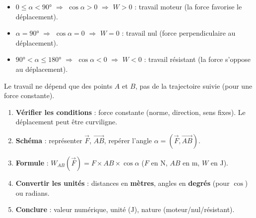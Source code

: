 \documentclass[11pt]{article}
\newcommand{\cle}[1]{{\popxbold\color{popdark}#1}}
\begin{document}
\begin{propriete}
\begin{itemize}
\item $0 \leq \alpha < 90°$ $\Rightarrow$ $\cos\alpha > 0$ $\Rightarrow$ $W > 0$ : travail \cle{moteur} (la force favorise le déplacement).
\item $\alpha = 90°$ $\Rightarrow$ $\cos\alpha = 0$ $\Rightarrow$ $W = 0$ : travail \cle{nul} (force perpendiculaire au déplacement).
\item $90° < \alpha \leq 180°$ $\Rightarrow$ $\cos\alpha < 0$ $\Rightarrow$ $W < 0$ : travail \cle{résistant} (la force s'oppose au déplacement).
\end{itemize}
Le travail ne dépend que des points $A$ et $B$, pas de la trajectoire suivie (pour une force constante).
\end{propriete}

\begin{methode}
\begin{enumerate}
\item \textbf{Vérifier les conditions} : force constante (norme, direction, sens fixes). Le déplacement peut être curviligne.
\item \textbf{Schéma} : représenter $\vec{F}$, $\overrightarrow{AB}$, repérer l'angle $\alpha = (\vec{F}, \overrightarrow{AB})$.
\item \textbf{Formule} : $W_{AB}(\vec{F}) = F \times AB \times \cos\alpha$ ($F$ en N, $AB$ en m, $W$ en J).
\item \textbf{Convertir les unités} : distances en \textbf{mètres}, angles en \textbf{degrés} (pour $\cos$) ou radians.
\item \textbf{Conclure} : valeur numérique, unité (J), nature (moteur/nul/résistant).
\end{enumerate}
\end{methode}
\end{document}
